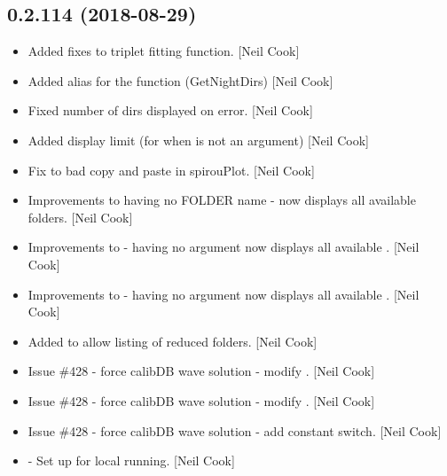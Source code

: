 \documentclass[a4paper,10pt,english]{report}
\begin{document}
\subsection{0.2.114 (2018-08-29)}
\label{\detokenize{misc/changelog:id345}}\begin{itemize}
\item {} 
Added fixes to triplet fitting function. {[}Neil Cook{]}

\item {} 
Added alias for the  function (GetNightDirs) {[}Neil Cook{]}

\item {} 
Fixed number of  dirs displayed on error. {[}Neil Cook{]}

\item {} 
Added  display limit (for when  is not an
argument) {[}Neil Cook{]}

\item {} 
Fix to bad copy and paste in spirouPlot. {[}Neil Cook{]}

\item {} 
Improvements to having no FOLDER name - now displays all available
folders. {[}Neil Cook{]}

\item {} 
Improvements to  - having no  argument now
displays all available . {[}Neil Cook{]}

\item {} 
Improvements to  - having no  argument now
displays all available . {[}Neil Cook{]}

\item {} 
Added  to allow listing of reduced folders.
{[}Neil Cook{]}

\item {} 
Issue \#428 - force calibDB wave solution - modify . {[}Neil
Cook{]}

\item {} 
Issue \#428 - force calibDB wave solution - modify .
{[}Neil Cook{]}

\item {} 
Issue \#428 - force calibDB wave solution - add constant switch. {[}Neil
Cook{]}

\item {} 
 - Set up for local running. {[}Neil Cook{]}

\end{itemize}
\end{document}
